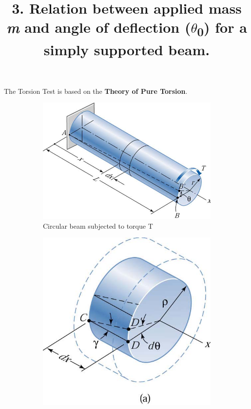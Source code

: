 \documentclass[12pt,a4paper]{article}	%
\title{3. Relation between applied mass \textit{m} and angle of deflection ($\theta$\textsubscript{0}) for a simply
	supported beam.}
\date{\vspace{-5ex}}	%
\begin{document}
\maketitle
The Torsion Test is based on the \textbf{Theory of Pure Torsion}.\\

	\begin{figure}[h!]
	\centering
	\begin{subfigure}[b]{0.5\linewidth}
		\includegraphics[width=\linewidth]{Ok.png}
		\caption{Circular beam subjected to torque T}
	\end{subfigure} \hspace{10mm}%
	\begin{subfigure}[b]{0.4\linewidth}
		\includegraphics[width=\linewidth]{Ok1.png}

\end{subfigure}
\end{figure}
\end{document}
